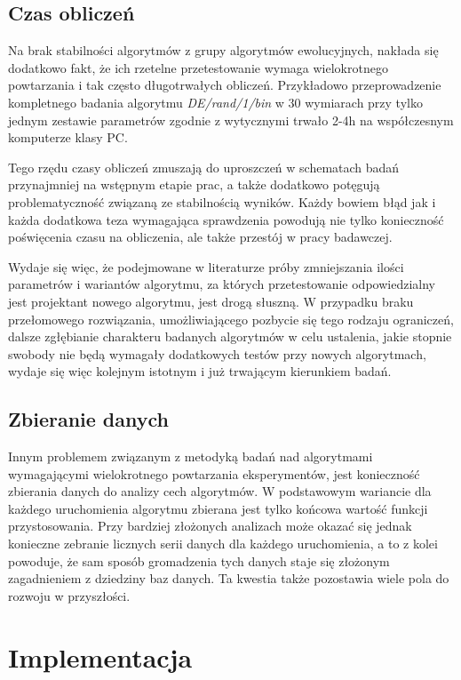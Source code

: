 \documentclass[12pt,a4paper]{report}
\begin{document}
{{{{{{{\subsection{Czas obliczeń}
\par{
Na brak stabilności algorytmów z grupy algorytmów ewolucyjnych, nakłada się dodatkowo fakt, że ich rzetelne przetestowanie wymaga wielokrotnego powtarzania i tak często długotrwałych obliczeń. Przykładowo przeprowadzenie kompletnego badania algorytmu \emph{DE/rand/1/bin} w 30 wymiarach przy tylko jednym zestawie parametrów zgodnie z wytycznymi \cite{CEC2013DEbasic} trwało 2-4h na współczesnym komputerze klasy PC.
}
\par{
Tego rzędu czasy obliczeń zmuszają do uproszczeń w schematach badań przynajmniej na wstępnym etapie prac, a także dodatkowo potęgują problematyczność związaną ze stabilnością wyników. Każdy bowiem błąd jak i każda dodatkowa teza wymagająca sprawdzenia powodują nie tylko konieczność poświęcenia czasu na obliczenia, ale także przestój w pracy badawczej.
}
\par{
Wydaje się więc, że podejmowane w literaturze próby zmniejszania ilości parametrów i wariantów algorytmu, za których przetestowanie odpowiedzialny jest projektant nowego algorytmu, jest drogą słuszną. W przypadku braku przełomowego rozwiązania, umożliwiającego pozbycie się tego rodzaju ograniczeń, dalsze zgłębianie charakteru badanych algorytmów w celu ustalenia, jakie stopnie swobody nie będą wymagały dodatkowych testów przy nowych algorytmach, wydaje się więc kolejnym istotnym i już trwającym kierunkiem badań.
}
\subsection{Zbieranie danych}
\par{
Innym problemem związanym z metodyką badań nad algorytmami wymagającymi wielokrotnego powtarzania eksperymentów, jest konieczność zbierania danych do analizy cech algorytmów. W podstawowym wariancie dla każdego uruchomienia algorytmu zbierana jest tylko końcowa wartość funkcji przystosowania. Przy bardziej złożonych analizach może okazać się jednak konieczne zebranie licznych serii danych dla każdego uruchomienia, a to z kolei powoduje, że sam sposób gromadzenia tych danych staje się złożonym zagadnieniem z dziedziny baz danych. Ta kwestia także pozostawia wiele pola do rozwoju w przyszłości.
}
\section{Implementacja}
}}}}}}}
\end{document}
